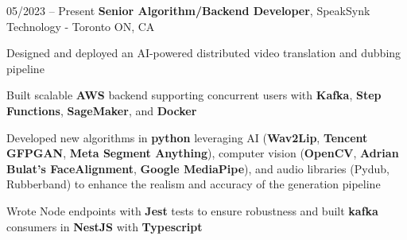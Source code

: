 \begin{twocolentry}{
    05/2023 – Present
}
\fontsize{11 pt}{11 pt}\textbf{Senior Algorithm/Backend Developer}, SpeakSynk Technology - Toronto ON, CA\end{twocolentry}

\vspace{0.10 cm}
\begin{onecolentry}
    \begin{highlights}
        \item Designed and deployed an AI-powered distributed video translation and dubbing pipeline
        \item Built scalable \textbf{AWS} backend supporting concurrent users with \textbf{Kafka}, \textbf{Step Functions}, \textbf{SageMaker}, and \textbf{Docker}
        \item Developed new algorithms in \textbf{python} leveraging AI (\textbf{Wav2Lip}, \textbf{Tencent GFPGAN}, \textbf{Meta Segment Anything}), computer vision (\textbf{OpenCV}, \textbf{Adrian Bulat’s FaceAlignment}, \textbf{Google MediaPipe}), and audio libraries (Pydub, Rubberband) to enhance the realism and accuracy of the generation pipeline 
        \item Wrote Node endpoints with \textbf{Jest} tests to ensure robustness and built \textbf{kafka} consumers in \textbf{NestJS} with \textbf{Typescript}
    \end{highlights}
\end{onecolentry}
